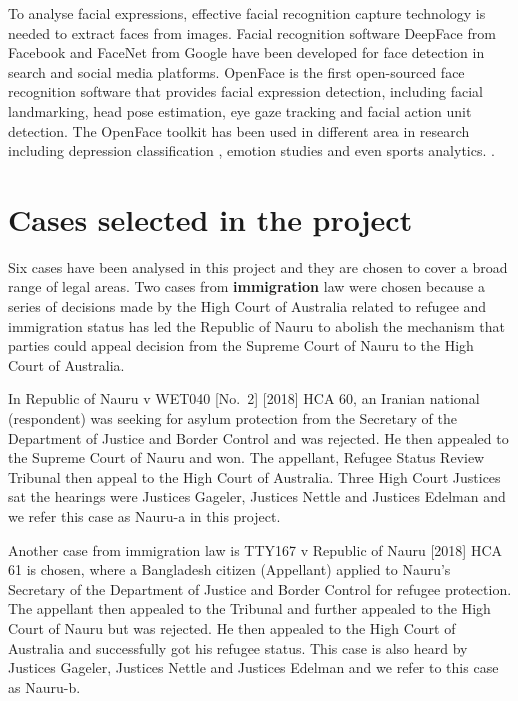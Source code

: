 \documentclass{monashthesis}
\begin{document}
To analyse facial expressions, effective facial recognition capture technology is needed to extract faces from images. Facial recognition software DeepFace \autocite{taigman2014deepface} from Facebook and FaceNet \autocite{schroff2015facenet} from Google have been developed for face detection in search and social media platforms. OpenFace \autocite{baltrusaitis2018openface} is the first open-sourced face recognition software that provides facial expression detection, including facial landmarking, head pose estimation, eye gaze tracking and facial action unit detection. The OpenFace toolkit has been used in different area in research including depression classification \autocite{yang2016decision}, emotion studies \autocite{huber2018emotional} and even sports analytics. \autocite{kovalchik2018going}.

\hypertarget{cases-selected-in-the-project}{%
\section{Cases selected in the project}\label{cases-selected-in-the-project}}

Six cases have been analysed in this project and they are chosen to cover a broad range of legal areas. Two cases from \textbf{immigration} law were chosen because a series of decisions made by the High Court of Australia related to refugee and immigration status has led the Republic of Nauru to abolish the mechanism that parties could appeal decision from the Supreme Court of Nauru to the High Court of Australia.

In Republic of Nauru v WET040 {[}No.~2{]} {[}2018{]} HCA 60, an Iranian national (respondent) was seeking for asylum protection from the Secretary of the Department of Justice and Border Control and was rejected. He then appealed to the Supreme Court of Nauru and won. The appellant, Refugee Status Review Tribunal then appeal to the High Court of Australia. Three High Court Justices sat the hearings were Justices Gageler, Justices Nettle and Justices Edelman and we refer this case as Nauru-a in this project.

Another case from immigration law is TTY167 v Republic of Nauru {[}2018{]} HCA 61 is chosen, where a Bangladesh citizen (Appellant) applied to Nauru's Secretary of the Department of Justice and Border Control for refugee protection. The appellant then appealed to the Tribunal and further appealed to the High Court of Nauru but was rejected. He then appealed to the High Court of Australia and successfully got his refugee status. This case is also heard by Justices Gageler, Justices Nettle and Justices Edelman and we refer to this case as Nauru-b.
\end{document}
